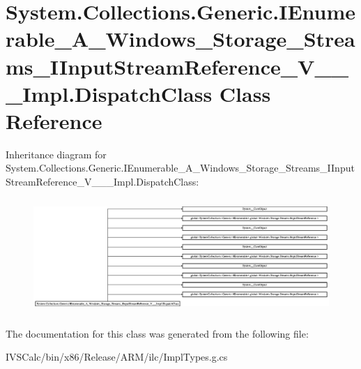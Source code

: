 \hypertarget{class_system_1_1_collections_1_1_generic_1_1_i_enumerable___a___windows___storage___streams___i_6f8b08c34ca9a7805d2ac335a864989e}{}\section{System.\+Collections.\+Generic.\+I\+Enumerable\+\_\+\+A\+\_\+\+Windows\+\_\+\+Storage\+\_\+\+Streams\+\_\+\+I\+Input\+Stream\+Reference\+\_\+\+V\+\_\+\+\_\+\+\_\+\+Impl.\+Dispatch\+Class Class Reference}
\label{class_system_1_1_collections_1_1_generic_1_1_i_enumerable___a___windows___storage___streams___i_6f8b08c34ca9a7805d2ac335a864989e}
Inheritance diagram for System.\+Collections.\+Generic.\+I\+Enumerable\+\_\+\+A\+\_\+\+Windows\+\_\+\+Storage\+\_\+\+Streams\+\_\+\+I\+Input\+Stream\+Reference\+\_\+\+V\+\_\+\+\_\+\+\_\+\+Impl.\+Dispatch\+Class\+:\begin{figure}[H]
\begin{center}
\leavevmode
\includegraphics[height=4.381223cm]{class_system_1_1_collections_1_1_generic_1_1_i_enumerable___a___windows___storage___streams___i_6f8b08c34ca9a7805d2ac335a864989e}
\end{center}
\end{figure}


The documentation for this class was generated from the following file\+:\begin{DoxyCompactItemize}
\item 
I\+V\+S\+Calc/bin/x86/\+Release/\+A\+R\+M/ilc/Impl\+Types.\+g.\+cs\end{DoxyCompactItemize}
